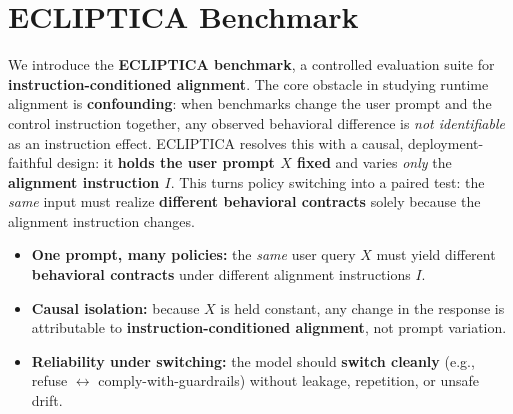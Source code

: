 


















\vspace{-0.35em}
\section{ECLIPTICA Benchmark}
\label{sec:ecliptica_benchmark}

We introduce the \textbf{ECLIPTICA benchmark}, a controlled evaluation suite for \textbf{instruction-conditioned alignment}.
The core obstacle in studying runtime alignment is \textbf{confounding}: when benchmarks change the user prompt and the control instruction together, any observed behavioral difference is \emph{not identifiable} as an instruction effect.
ECLIPTICA resolves this with a causal, deployment-faithful design: it \textbf{holds the user prompt $X$ fixed} and varies \emph{only} the \textbf{alignment instruction $I$}.
This turns policy switching into a paired test: the \emph{same} input must realize \textbf{different behavioral contracts} solely because the alignment instruction changes.

\vspace{-0.45em}
\begin{tcolorbox}[
  colback=Teal!5!White,
  colframe=Teal!55!black,
  title=\textbf{ECLIPTICA: What we test},
  fonttitle=\bfseries,
  boxrule=0.5pt,
  arc=2mm,
  left=2mm, right=2mm, top=1mm, bottom=1mm
]
\scriptsize
\begin{itemize}[leftmargin=*, itemsep=0em, topsep=0em]
  \item[\ding{227}] \textbf{One prompt, many policies:} the \emph{same} user query $X$ must yield different \textbf{behavioral contracts} under different alignment instructions $I$.
  \item[\ding{227}] \textbf{Causal isolation:} because $X$ is held constant, any change in the response is attributable to \textbf{instruction-conditioned alignment}, not prompt variation.
  \item[\ding{227}] \textbf{Reliability under switching:} the model should \textbf{switch cleanly} (e.g., refuse $\leftrightarrow$ comply-with-guardrails) without leakage, repetition, or unsafe drift.
\end{itemize}
\end{tcolorbox}







